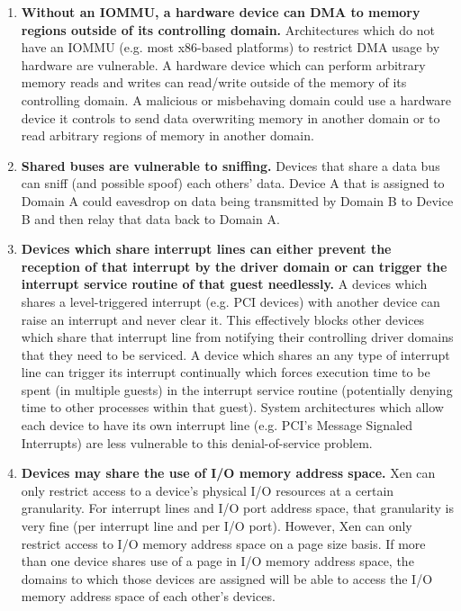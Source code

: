 \documentclass[11pt,twoside,final,openright]{report}
\begin{document}
\begin{enumerate}
\item \textbf{Without an IOMMU, a hardware device can DMA to memory regions
  outside of its controlling domain.} Architectures which do not have an
  IOMMU (e.g. most x86-based platforms) to restrict DMA usage by hardware
  are vulnerable. A hardware device which can perform arbitrary memory reads
  and writes can read/write outside of the memory of its controlling domain.
  A malicious or misbehaving domain could use a hardware device it controls
  to send data overwriting memory in another domain or to read arbitrary
  regions of memory in another domain.
\item \textbf{Shared buses are vulnerable to sniffing.} Devices that share
  a data bus can sniff (and possible spoof) each others' data. Device A that
  is assigned to Domain A could eavesdrop on data being transmitted by
  Domain B to Device B and then relay that data back to Domain A.
\item \textbf{Devices which share interrupt lines can either prevent the
  reception of that interrupt by the driver domain or can trigger the
  interrupt service routine of that guest needlessly.} A devices which shares
  a level-triggered interrupt (e.g. PCI devices) with another device can
  raise an interrupt and never clear it. This effectively blocks other devices
  which share that interrupt line from notifying their controlling driver
  domains that they need to be serviced. A device which shares an
  any type of interrupt line can trigger its interrupt continually which
  forces execution time to be spent (in multiple guests) in the interrupt
  service routine (potentially denying time to other processes within that
  guest). System architectures which allow each device to have its own
  interrupt line (e.g. PCI's Message Signaled Interrupts) are less
  vulnerable to this denial-of-service problem.
\item \textbf{Devices may share the use of I/O memory address space.} Xen can
  only restrict access to a device's physical I/O resources at a certain
  granularity. For interrupt lines and I/O port address space, that
  granularity is very fine (per interrupt line and per I/O port). However,
  Xen can only restrict access to I/O memory address space on a page size
  basis. If more than one device shares use of a page in I/O memory address
  space, the domains to which those devices are assigned will be able to
  access the I/O memory address space of each other's devices.
\end{enumerate}
\end{document}
